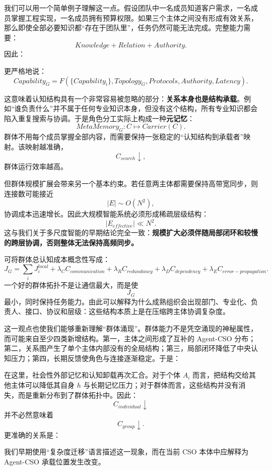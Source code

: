 我们可以用一个简单例子理解这一点。假设团队中一名成员知道客户需求，一名成员掌握工程实现，一名成员拥有预算权限。如果三个主体之间没有形成有效关系，那么即使全部必要知识都``存在于团队里''，任务仍然可能无法完成。完整能力需要：
\[
Knowledge
+
Relation
+
Authority.
\]
因此：
\begin{statementbox}
\centering
{}
\end{statementbox}
更严格地说：
\[
Capability_G
=
F(
\{Capability_i\},
Topology_G,
Protocols,
Authority,
Latency
).
\]

这意味着认知结构具有一个非常容易被忽略的部分：\textbf{关系本身也是结构承载}。例如``谁负责什么''并不属于任何专业知识本身，但没有这个结构，所有专业知识都会陷入重复搜索与协调。于是角色分工实际上构成一种\textbf{元记忆}：
\[
MetaMemory_G:
C
\mapsto
Carrier(C).
\]
群体不用每个成员掌握全部内容，而需要保持一张稳定的``认知结构到承载者''映射。该映射越准确，
\[
C_{search}\downarrow,
\]
群体运行效率越高。

但群体规模扩展会带来另一个基本约束。若任意两主体都需要保持高带宽同步，则连接数可能接近
\[
|E|\sim O(N^2),
\]
协调成本迅速增长。因此大规模智能系统必须形成稀疏层级结构：
\[
|E_{effective}|\ll N^2.
\]
这与我们关于多尺度智能的早期结论完全一致：\textbf{规模扩大必须伴随局部闭环和较慢的跨层协调，否则整体无法保持高频同步。}

可将群体总认知成本概念性写成：
\[
J_G
=
\sum_i J_i^{local}
+
\lambda_C C_{communication}
+
\lambda_R C_{redundancy}
+
\lambda_D C_{dependency}
+
\lambda_E C_{error-propagation}.
\]
一个好的群体拓扑不是让通信最大，而是使
\[
J_G
\]
最小，同时保持任务能力。由此可以解释为什么成熟组织会出现部门、专业化、负责人、接口、协议和层级：这些结构本质上是在压缩跨主体协调复杂度。

这一观点也使我们能够重新理解``群体涌现''。群体能力不是凭空涌现的神秘属性，而可能来自至少四类新增结构。第一，主体之间形成了互补的 Agent-CSO 分布；第二，关系图产生了单个主体内部没有的全局结构；第三，局部闭环降低了中央认知压力；第四，长期反馈使角色与连接逐渐稳定。于是：
\begin{statementbox}
\centering
{}
\end{statementbox}

在这里，社会性外部记忆和认知卸载再次汇合。对于个体 $A_i$ 而言，把结构交给其他主体可以降低其自身 $h$ 与长期记忆压力；对于群体而言，这些结构并没有消失，而是重新分布到了群体拓扑中。因此：
\[
C_{individual}\downarrow
\]
并不必然意味着
\[
C_{group}\downarrow.
\]
更准确的关系是：
\begin{statementbox}
\centering
{}
\end{statementbox}
我们早期使用``复杂度迁移''语言描述这一现象，而在当前 CSO 本体中应解释为 Agent-CSO 承载位置发生改变。

